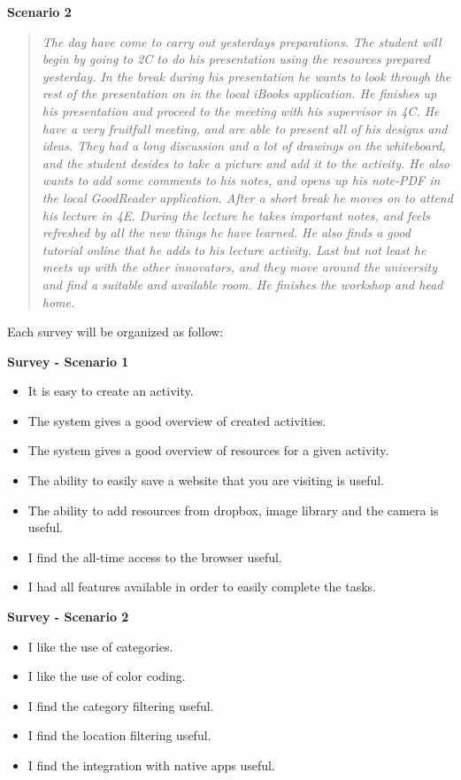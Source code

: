 \textbf{Scenario 2}
\begin{quotation}
\emph{
The day have come to carry out yesterdays preparations. The student will begin by going to 2C to do his presentation using the resources prepared yesterday. In the break during his presentation he wants to look through the rest of the presentation on in the local iBooks application. He finishes up his presentation and proceed to the meeting with his supervisor in 4C. He have a very fruitfull meeting, and are able to present all of his designs and ideas. They had a long discussion and a lot of drawings on the whiteboard, and the student desides to take a picture and add it to the activity. He also wants to add some comments to his notes, and opens up his note-PDF in the local GoodReader application. After a short break he moves on to attend his lecture in 4E. During the lecture he takes important notes, and feels refreshed by all the new things he have learned. He also finds a good tutorial online that he adds to his lecture activity. Last but not least he meets up with the other innovators, and they move around the university and find a suitable and available room. He finishes the workshop and head home.
}
\end{quotation}

Each survey will be organized as follow:
\par\vspace{\baselineskip}
\textbf{Survey - Scenario 1}
\begin{itemize}
	\item It is easy to create an activity.
	\item The system gives a good overview of created activities.
	\item The system gives a good overview of resources for a given activity.
	\item The ability to easily save a website that you are visiting is useful.
	\item The ability to add resources from dropbox, image library and the camera is useful.
	\item I find the all-time access to the browser useful.
	\item I had all features available in order to easily complete the tasks.
\end{itemize}

\textbf{Survey - Scenario 2}
\begin{itemize}
	\item I like the use of categories.
	\item I like the use of color coding.
	\item I find the category filtering useful.
	\item I find the location filtering useful.
	\item I find the integration with native apps useful.
\end{itemize}

